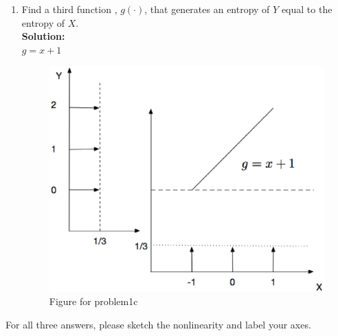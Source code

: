 \documentclass{assignment}
\begin{document}
\begin{enumerate}
\item  Find a third function , $g(\cdot )$, that generates an entropy of $Y$ equal to the entropy of $X$.\\
  \textbf{Solution:} \\
  $g = x + 1$
  \begin{figure}[!h]
  \centering
  \includegraphics[width=5in]{pics/problem1c.eps}
  \caption{Figure for problem1c}
  \label{fig:problem1c}
  \end{figure}

\end{enumerate}
For all three answers, please sketch the nonlinearity and label your axes.
\end{document}
